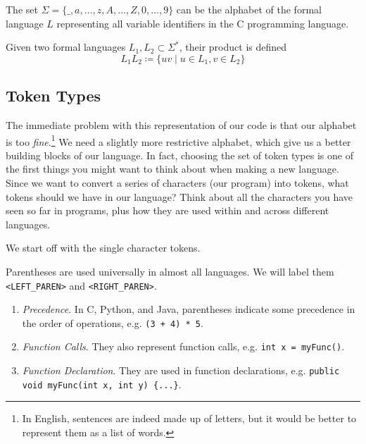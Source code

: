   \begin{example}[C Identifiers]
    The set $\Sigma = \{\_, a, \ldots, z, A, \ldots, Z, 0, \ldots, 9\}$ can be the alphabet of the formal language $L$ representing all variable identifiers in the C programming language. 
  \end{example}

  \begin{definition}
    Given two formal languages $L_1, L_2 \subset \Sigma^\ast$, their product is defined 
    \begin{equation}
      L_1 L_2 \coloneqq \{ uv \mid u \in L_1, v \in L_2 \}
    \end{equation}
  \end{definition}

\subsection{Token Types}

  The immediate problem with this representation of our code is that our alphabet is too \textit{fine}.\footnote{In English, sentences are indeed made up of letters, but it would be better to represent them as a list of words.} We need a slightly more restrictive alphabet, which give us a better building blocks of our language. In fact, choosing the set of token types is one of the first things you might want to think about when making a new language. Since we want to convert a series of characters (our program) into tokens, what tokens should we have in our language? Think about all the characters you have seen so far in programs, plus how they are used within and across different languages. 

  We start off with the single character tokens. 

  \begin{example}[Parentheses]
    Parentheses are used universally in almost all languages. We will label them \texttt{<LEFT\_PAREN>} and \texttt{<RIGHT\_PAREN>}.
    \begin{enumerate}
      \item \textit{Precedence}. In C, Python, and Java, parentheses indicate some precedence in the order of operations, e.g. \texttt{(3 + 4) * 5}.
      \item \textit{Function Calls}. They also represent function calls, e.g. \texttt{int x = myFunc()}. 
      \item \textit{Function Declaration}. They are used in function declarations, e.g. \texttt{public void myFunc(int x, int y) \{...\}}. 
    \end{enumerate}
  \end{example}

